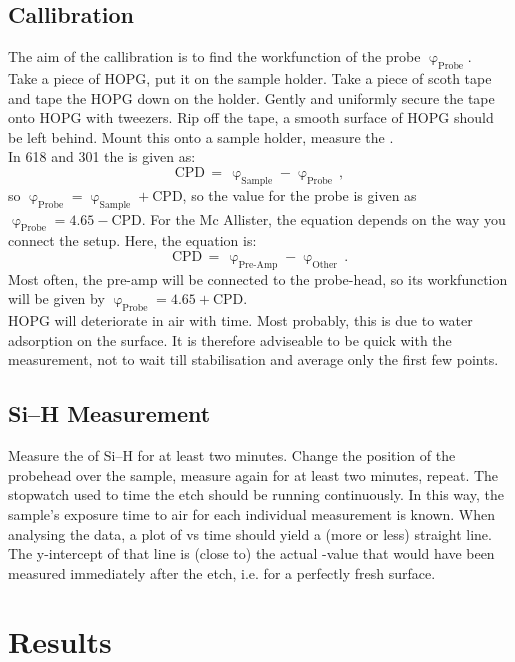 \documentclass[a4paper,10pt]{article}
\newcommand{\sih}{Si--H}
\newcommand{\wfp}{\ensuremath{\upvarphi _{\text{Probe}}}}
\newcommand{\wfs}{\ensuremath{\upvarphi _{\text{Sample}}}}
\newcommand{\cpd}{\text{CPD}}
\newcommand{\McA}{Mc Allister}
\newcommand{\hopg}{HOPG}
\begin{document}
\subsection{Callibration}
The aim of the callibration is to find the workfunction of the probe \wfp.\\
Take a piece of \hopg{}, put it on the sample holder. Take a piece of scoth tape and tape the \hopg{} down on the holder. Gently and uniformly secure the tape onto \hopg{} with tweezers. Rip off the tape, a smooth surface of \hopg{} should be left behind. Mount this onto a sample holder, measure the \cpd{}.\\
In 618 and 301 the \cpd{} is given as:
\begin{equation}
\cpd  \, = \, \wfs - \wfp \, ,
\end{equation}
so $\wfp = \wfs + \cpd$, so the value for the probe is given as  $\wfp = 4.65 - \cpd$. For the \McA, the equation depends on the way you connect the setup. Here, the equation is:
\begin{equation}
\cpd  \, = \, \upvarphi _{\text{Pre-Amp}} - \upvarphi _{\text{Other}} \, .
\end{equation}
Most often, the pre-amp will be connected to the probe-head, so its workfunction will be given by $\wfp = 4.65 + \cpd$.\\
\hopg{} will deteriorate in air with time. Most probably, this is due to water adsorption on the surface. It is therefore adviseable to be quick with the measurement, not to wait till stabilisation and average only the first few points.

\subsection{\sih{} Measurement}
Measure the \cpd{} of \sih{} for at least two minutes. Change the position of the probehead over the sample, measure again for at least two minutes, repeat. The stopwatch used to time the etch should be running continuously. In this way, the sample's exposure time to air for each individual \cpd{} measurement is known. When analysing the data, a plot of \cpd{} vs time should yield a (more or less) straight line. The y-intercept of that line is (close to) the actual \cpd{}-value that would have been measured immediately after the etch, i.e. for a perfectly fresh surface.

\section{Results}
	\label{sec:results}
\end{document}
